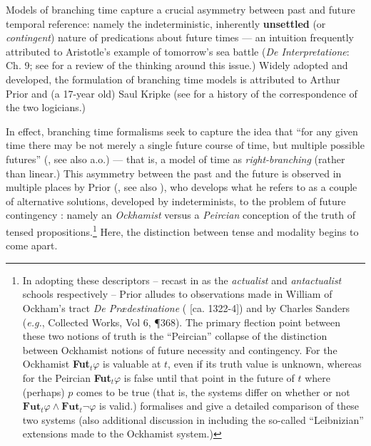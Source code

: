 \documentclass[11pt,dvipsnames]{report}
\begin{document}
Models of branching time capture a crucial asymmetry between past and future temporal reference: namely the indeterministic, inherently \textbf{unsettled} (or \textit{contingent}) nature of predications about future times --- an intuition frequently attributed to Aristotle's example of tomorrow's sea battle (\textit{De Interpretatione}: Ch. 9; see \citealt{Øhrstrøm1995} for a review of the thinking around this issue.) Widely adopted and developed, the formulation of branching time models is attributed to Arthur Prior and (a 17-year old) Saul Kripke (see \citealt{Ploug2012} for a history of the correspondence of the two logicians.)


 In effect, branching time formalisms seek to capture the idea that ``for any given time there may be not merely a single future course of time, but multiple possible futures'' (\citealp[63]{Dowty1977}, see also \citealp{Thomason1970,Burgess1978} a.o.) --- that is, a model of time as \textit{right-branching} (rather than linear.) This asymmetry between the past and the future is observed in multiple places by Prior (\citeyear{Prior1957,Prior1967}, see also \citealt{Copeland2020}), who develops what he refers to as a couple of alternative solutions, developed by indeterminists, to the problem of future contingency \citeyearpar[\textit{e.g.},][121\textit{ff}]{Prior1967}: namely an \textit{Ockhamist} versus a \textit{Peircian} conception of the truth of tensed propositions.\footnote{In adopting these descriptors -- recast in \citealt{Burgess1978} as the \textit{actualist} and \textit{antactualist} schools respectively -- Prior alludes to observations made in William of Ockham's tract \textit{De Prædestinatione} (\citeyear{praedestinatione} [ca. 1322-4]) and by Charles Sanders \citeauthor{Peirce} (\textit{e.g.}, Collected Works, Vol 6, ¶368). The primary flection point between these two notions of truth is the ``Peircian'' collapse of the distinction between Ockhamist notions of future necessity and contingency. For the Ockhamist \textbf{Fut}$ _t\varphi$ is valuable at $ t $, even if its truth value is unknown, whereas for the Peircian \textbf{Fut}$_t\varphi $ is false until that point in the future of $ t $ where (perhaps) $ p $ comes to be true (that is, the systems differ on whether or not $ \textbf{Fut}_t\varphi\wedge\textbf{Fut}_t\neg\varphi $ is valid.) \citet[126\textit{ff}]{Prior1967} formalises and give a detailed comparison of these two systems (also additional discussion in \citealp{Øhrstrøm1995,Øhrstrøm2020,Nishimura1979} including the so-called ``Leibnizian'' extensions made to the Ockhamist system.)\label{FutCont}} Here, the distinction between tense and modality begins to come apart.
\end{document}
